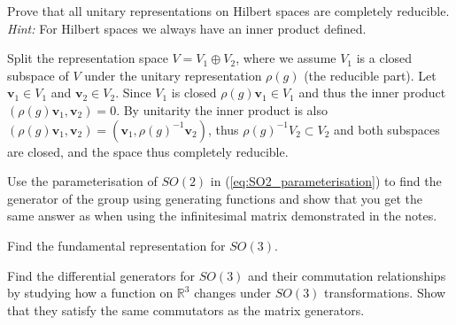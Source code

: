 \documentclass[notes.tex]{subfiles}
\begin{document}
\begin{Exercise}[difficulty={2}]
Prove that all unitary representations on Hilbert spaces are completely reducible. {\it Hint:} For Hilbert spaces we always have an inner product defined.
\end{Exercise}
\begin{Answer}
Split the representation space $V=V_1\oplus V_2$, where we assume $V_1$ is a closed subspace of $V$ under the unitary representation $\rho(g)$ (the reducible part). Let $\mathbf v_1\in V_1$ and $\mathbf v_2\in V_2$.  Since $V_1$ is closed $\rho(g)\mathbf v_1 \in V_1$ and thus the inner product $(\rho(g)\mathbf v_1,  \mathbf v_2)=0$.  By unitarity the inner product is also $(\rho(g)\mathbf v_1,  \mathbf v_2)=(\mathbf v_1, \rho(g)^{-1}\mathbf v_2)$, thus $\rho(g)^{-1}V_2 \subset V_2$ and both subspaces are closed, and the space thus completely reducible. 
\end{Answer}


\begin{Exercise}[difficulty={1}]
Use the parameterisation of $SO(2)$ in (\ref{eq:SO2_parameterisation}) to find the generator of the group using generating functions and show that you get the same answer as when using the infinitesimal matrix demonstrated in the notes.
\end{Exercise}


\begin{Exercise}[]
Find the fundamental representation for $SO(3)$.
\end{Exercise}


\begin{Exercise}[difficulty={3},label=ex:SO2_diff_generators]
Find the differential generators for $SO(3)$ and their commutation relationships by studying how a function on $\mathbb R^3$ changes under $SO(3)$ transformations. Show that they satisfy the same commutators as the matrix generators.
\end{Exercise}
\end{document}

